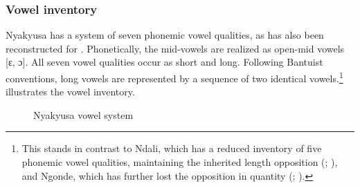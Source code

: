 \subsubsection{Vowel inventory}
Nyakyusa has a system of seven phonemic vowel qualities, as has also been reconstructed for  \citep[147]{SchadebergT2003b}. Phonetically, the mid-vowels are realized as open-mid vowels [ɛ, ɔ]. All seven vowel qualities occur as short and long.  Following Bantuist conventions, long vowels are represented by a sequence of two identical vowels.\footnote{This stands in contrast to Ndali, which has a reduced inventory of five phonemic vowel qualities, maintaining the inherited length opposition (\citealt{LabroussiC1998}; \citealt{BotneR2008}), and Ngonde, which has further lost the opposition in quantity (\citealt{LabroussiC1998}; \citealt{KishindoP1999}).}  illustrates the vowel inventory.
\begin{figure}[h]
	\begin{center}
		\begin{vowel}%
		\end{vowel}
		\begin{vowel}
		\end{vowel}
	\end{center}
\caption{Nyakyusa vowel system}\label{exVokalsystem}
\end{figure}


